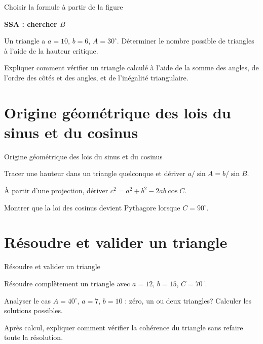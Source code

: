 \begin{exerciseblock}{Choisir la formule à partir de la figure}
\begin{center}
\begin{minipage}[t]{0.47\linewidth}
\begin{tikzpicture}[scale=0.85,every node/.style={font=\small}]
\end{tikzpicture}
\end{minipage}\hfill
\begin{minipage}[t]{0.47\linewidth}\centering
\textbf{SSA : chercher $B$}\par
{}
\end{minipage}
\end{center}
\item Un triangle a $a=10$, $b=6$, $A=30^\circ$. Déterminer le nombre possible de triangles à l'aide de la hauteur critique.
\item Expliquer comment vérifier un triangle calculé à l'aide de la somme des angles, de l'ordre des côtés et des angles, et de l'inégalité triangulaire.
\end{exerciseblock}
\section{Origine géométrique des lois du sinus et du cosinus}
\label{workbook:section:15.04}
\begin{exerciseblock}{Origine géométrique des lois du sinus et du cosinus}
\item Tracer une hauteur dans un triangle quelconque et dériver $a/\sin A=b/\sin B$.
\item À partir d'une projection, dériver $c^2=a^2+b^2-2ab\cos C$.
\item Montrer que la loi des cosinus devient Pythagore lorsque $C=90^\circ$.
\end{exerciseblock}
\section{Résoudre et valider un triangle}
\label{workbook:section:15.05}
\begin{exerciseblock}{Résoudre et valider un triangle}
\item Résoudre complètement un triangle avec $a=12$, $b=15$, $C=70^\circ$.
\item Analyser le cas $A=40^\circ$, $a=7$, $b=10$ : zéro, un ou deux triangles? Calculer les solutions possibles.
\item Après calcul, expliquer comment vérifier la cohérence du triangle sans refaire toute la résolution.
\end{exerciseblock}

